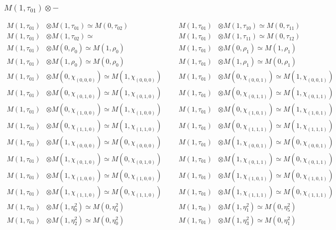 \subsubsection{$ M(1,\tau_{01})\otimes -$}
\begin{align*}
M(1,\tau_{01}) &\otimes M(1,\tau_{01}) \simeq M(0,\tau_{02}) &&& M(1,\tau_{01}) &\otimes M(1,\tau_{10}) \simeq M(0,\tau_{11})\\
M(1,\tau_{01}) &\otimes M(1,\tau_{02}) \simeq  &&& M(1,\tau_{01}) &\otimes M(1,\tau_{11}) \simeq M(0,\tau_{12})\\
M(1,\tau_{01}) &\otimes M(0,\rho_{0}) \simeq M(1,\rho_{0}) &&& M(1,\tau_{01}) &\otimes M(0,\rho_{1}) \simeq M(1,\rho_{1})\\
M(1,\tau_{01}) &\otimes M(1,\rho_{0}) \simeq M(0,\rho_{0}) &&& M(1,\tau_{01}) &\otimes M(1,\rho_{1}) \simeq M(0,\rho_{1})\\
M(1,\tau_{01}) &\otimes M(0,\chi_{(0,0,0)}) \simeq M(1,\chi_{(0,0,0)}) &&& M(1,\tau_{01}) &\otimes M(0,\chi_{(0,0,1)}) \simeq M(1,\chi_{(0,0,1)})\\
M(1,\tau_{01}) &\otimes M(0,\chi_{(0,1,0)}) \simeq M(1,\chi_{(0,1,0)}) &&& M(1,\tau_{01}) &\otimes M(0,\chi_{(0,1,1)}) \simeq M(1,\chi_{(0,1,1)})\\
M(1,\tau_{01}) &\otimes M(0,\chi_{(1,0,0)}) \simeq M(1,\chi_{(1,0,0)}) &&& M(1,\tau_{01}) &\otimes M(0,\chi_{(1,0,1)}) \simeq M(1,\chi_{(1,0,1)})\\
M(1,\tau_{01}) &\otimes M(0,\chi_{(1,1,0)}) \simeq M(1,\chi_{(1,1,0)}) &&& M(1,\tau_{01}) &\otimes M(0,\chi_{(1,1,1)}) \simeq M(1,\chi_{(1,1,1)})\\
M(1,\tau_{01}) &\otimes M(1,\chi_{(0,0,0)}) \simeq M(0,\chi_{(0,0,0)}) &&& M(1,\tau_{01}) &\otimes M(1,\chi_{(0,0,1)}) \simeq M(0,\chi_{(0,0,1)})\\
M(1,\tau_{01}) &\otimes M(1,\chi_{(0,1,0)}) \simeq M(0,\chi_{(0,1,0)}) &&& M(1,\tau_{01}) &\otimes M(1,\chi_{(0,1,1)}) \simeq M(0,\chi_{(0,1,1)})\\
M(1,\tau_{01}) &\otimes M(1,\chi_{(1,0,0)}) \simeq M(0,\chi_{(1,0,0)}) &&& M(1,\tau_{01}) &\otimes M(1,\chi_{(1,0,1)}) \simeq M(0,\chi_{(1,0,1)})\\
M(1,\tau_{01}) &\otimes M(1,\chi_{(1,1,0)}) \simeq M(0,\chi_{(1,1,0)}) &&& M(1,\tau_{01}) &\otimes M(1,\chi_{(1,1,1)}) \simeq M(0,\chi_{(1,1,1)})\\
M(1,\tau_{01}) &\otimes M(1,\eta^{2}_{0}) \simeq M(0,\eta^{2}_{4}) &&& M(1,\tau_{01}) &\otimes M(1,\eta^{2}_{1}) \simeq M(0,\eta^{2}_{5})\\
M(1,\tau_{01}) &\otimes M(1,\eta^{2}_{2}) \simeq M(0,\eta^{2}_{0}) &&& M(1,\tau_{01}) &\otimes M(1,\eta^{2}_{3}) \simeq M(0,\eta^{2}_{1})\\

\end{align*}
